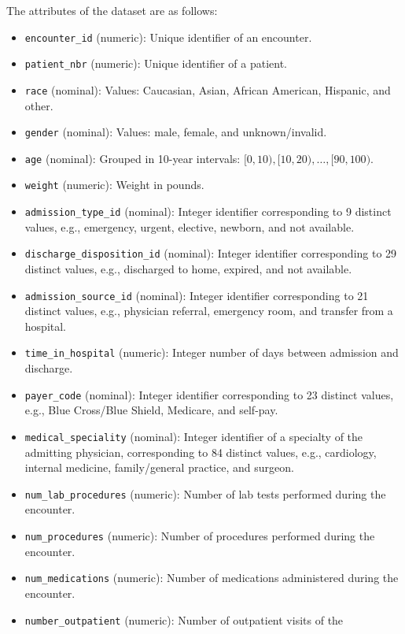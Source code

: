 \documentclass{article}\usepackage[]{graphicx}\usepackage[]{color}
\begin{document}
The attributes of the dataset are as follows:
\begin{itemize}[noitemsep]
\item \texttt{encounter\_id} (numeric): Unique identifier of an encounter.
\item \texttt{patient\_nbr} (numeric): Unique identifier of a patient.
\item \texttt{race} (nominal): Values: Caucasian, Asian, African American,
  Hispanic, and other.
\item \texttt{gender} (nominal): Values: male, female, and unknown/invalid.
\item \texttt{age} (nominal): Grouped in \num{10}-year intervals:
  $[0, 10), [10, 20), \ldots, [90, 100)$.
\item \texttt{weight} (numeric): Weight in pounds.
\item \texttt{admission\_type\_id} (nominal): Integer identifier corresponding
  to \num{9} distinct values, e.g., emergency, urgent, elective, newborn, and
  not available.
\item \texttt{discharge\_disposition\_id} (nominal): Integer identifier
  corresponding to \num{29} distinct values, e.g., discharged to home, expired,
  and not available.
\item \texttt{admission\_source\_id} (nominal): Integer identifier corresponding
  to \num{21} distinct values, e.g., physician referral, emergency room, and
  transfer from a hospital.
\item \texttt{time\_in\_hospital} (numeric): Integer number of days between
  admission and discharge.
\item \texttt{payer\_code} (nominal): Integer identifier corresponding to
  \num{23} distinct values, e.g., Blue Cross/Blue Shield, Medicare, and
  self-pay.
\item \texttt{medical\_speciality} (nominal): Integer identifier of a specialty
  of the admitting physician, corresponding to \num{84} distinct values, e.g.,
  cardiology, internal medicine, family/general practice, and surgeon.
\item \texttt{num\_lab\_procedures} (numeric): Number of lab tests performed
  during the encounter.
\item \texttt{num\_procedures} (numeric): Number of procedures performed during
  the encounter.
\item \texttt{num\_medications} (numeric): Number of medications administered
  during the encounter.
\item \texttt{number\_outpatient} (numeric): Number of outpatient visits of the

\end{itemize}
\end{document}
